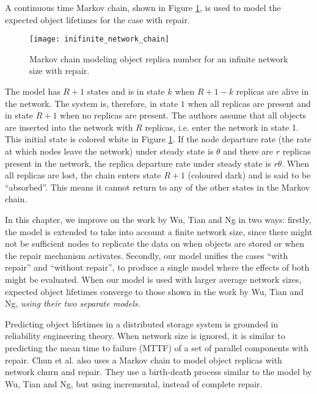 
A continuous time Markov chain, shown in Figure \ref{fig_other_markov_chain}, is used to model the expected object lifetimes for the case with repair.
%
\begin{figure}[htbp]
 \centering
 \texttt{[image: inifinite\_network\_chain]}
 \caption{Markov chain modeling object replica number for an infinite network size with repair.}
 \label{fig_other_markov_chain}
\end{figure}
%
The model has $R+1$ states and is in state $k$ when $R+1-k$ replicas are alive in the network. The system is, therefore, in state $1$ when all replicas are present and in state $R+1$ when no replicas are present. The authors assume that all objects are inserted into the network with $R$ replicas, i.e. enter the network in state 1. This initial state is colored white in Figure \ref{fig_other_markov_chain}. If the node departure rate (the rate at which nodes leave the network) under steady state is $\theta$ and there are $r$ replicas present in the network, the replica departure rate under steady state is $r\theta$. When all replicas are lost, the chain enters state $R+1$ (coloured dark) and is said to be ``absorbed''. This means it cannot return to any of the other states in the Markov chain.

In this chapter, we improve on the work by Wu, Tian and Ng \cite{replication_article} in two ways: firstly, the model is extended to take into account a finite network size, since there might not be sufficient nodes to replicate the data on when objects are stored or when the repair mechanism activates. Secondly, our model unifies the cases ``with repair'' and ``without repair'', to produce a single model where the effects of both might be evaluated. When our model is used with larger average network sizes, expected object lifetimes converge to those shown in the work by Wu, Tian and Ng, \emph{using their two separate models}.

Predicting object lifetimes in a distributed storage system is grounded in reliability engineering theory. When network size is ignored, it is similar to predicting the mean time to failure (MTTF) of a set of parallel components with repair. Chun et al. \cite{Chun:2006_replica_maintenance} also uses a Markov chain to model object replicas with network churn and repair. They use a birth-death process similar to the model by Wu, Tian and Ng, but using incremental, instead of complete repair.

